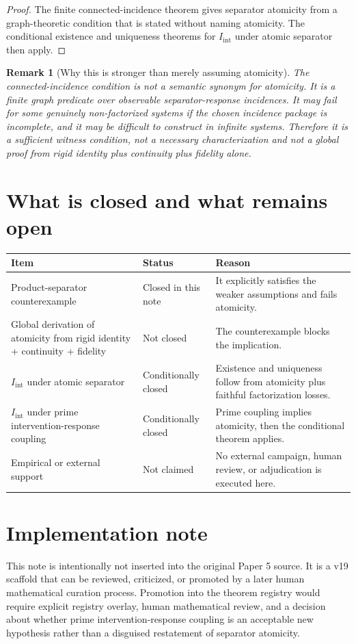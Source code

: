 \documentclass[11pt]{article}
\newtheorem{remark}[definition]{Remark}
\newcommand{\Iint}{I_{\mathrm{int}}}
\begin{document}
\begin{proof}
The finite connected-incidence theorem gives separator atomicity from a graph-theoretic condition that is stated without naming atomicity. The conditional existence and uniqueness theorems for $\Iint$ under atomic separator then apply.
\end{proof}

\begin{remark}[Why this is stronger than merely assuming atomicity]
The connected-incidence condition is not a semantic synonym for atomicity. It is a finite graph predicate over observable separator-response incidences. It may fail for some genuinely non-factorized systems if the chosen incidence package is incomplete, and it may be difficult to construct in infinite systems. Therefore it is a sufficient witness condition, not a necessary characterization and not a global proof from rigid identity plus continuity plus fidelity alone.
\end{remark}

\section{What is closed and what remains open}

\begin{longtable}{p{}p{}p{}}
\toprule
Item & Status & Reason \\
\midrule
Product-separator counterexample & Closed in this note & It explicitly satisfies the weaker assumptions and fails atomicity. \\
Global derivation of atomicity from rigid identity + continuity + fidelity & Not closed & The counterexample blocks the implication. \\
$\Iint$ under atomic separator & Conditionally closed & Existence and uniqueness follow from atomicity plus faithful factorization losses. \\
$\Iint$ under prime intervention-response coupling & Conditionally closed & Prime coupling implies atomicity, then the conditional theorem applies. \\
Empirical or external support & Not claimed & No external campaign, human review, or adjudication is executed here. \\
\bottomrule
\end{longtable}

\section{Implementation note}
This note is intentionally not inserted into the original Paper 5 source. It is a v19 scaffold that can be reviewed, criticized, or promoted by a later human mathematical curation process. Promotion into the theorem registry would require explicit registry overlay, human mathematical review, and a decision about whether prime intervention-response coupling is an acceptable new hypothesis rather than a disguised restatement of separator atomicity.
\end{document}
